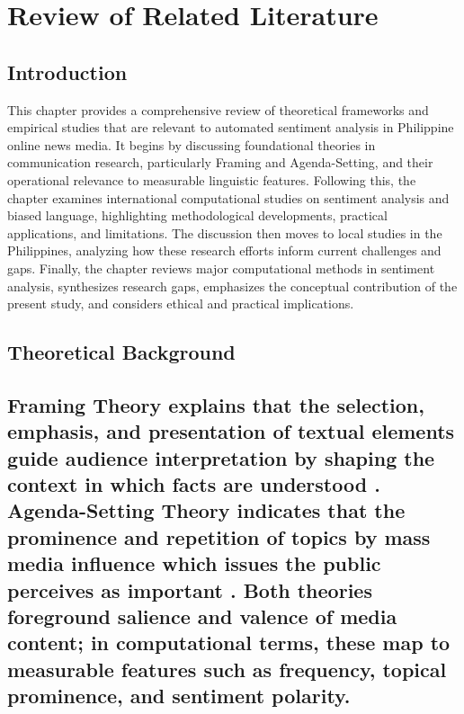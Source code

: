 \section{Review of Related Literature}



\subsection{Introduction}
This chapter provides a comprehensive review of theoretical frameworks and empirical studies that are relevant to automated sentiment analysis in Philippine online news media. It begins by discussing foundational theories in communication research, particularly Framing and Agenda-Setting, and their operational relevance to measurable linguistic features. Following this, the chapter examines international computational studies on sentiment analysis and biased language, highlighting methodological developments, practical applications, and limitations. The discussion then moves to local studies in the Philippines, analyzing how these research efforts inform current challenges and gaps. Finally, the chapter reviews major computational methods in sentiment analysis, synthesizes research gaps, emphasizes the conceptual contribution of the present study, and considers ethical and practical implications.

\subsection{Theoretical Background}
\label{theoretical-background}

\subsection{Framing Theory explains that the selection, emphasis, and presentation of textual elements guide audience interpretation by shaping the context in which facts are understood \cite{ref04}. Agenda-Setting Theory indicates that the prominence and repetition of topics by mass media influence which issues the public perceives as important \cite{ref11}. Both theories foreground salience and valence of media content; in computational terms, these map to measurable features such as frequency, topical prominence, and sentiment polarity.}\label{framing-theory-explains-that-the-selection-emphasis-and-presentation-of-textual-elements-guide-audience-interpretation-by-shaping-the-context-in-which-facts-are-understood-4.-agenda-setting-theory-indicates-that-the-prominence-and-repetition-of-topics-by-mass-media-influence-which-issues-the-public-perceives-as-important-11.-both-theories-foreground-salience-and-valence-of-media-content-in-computational-terms-these-map-to-measurable-features-such-as-frequency-topical-prominence-and-sentiment-polarity.}

